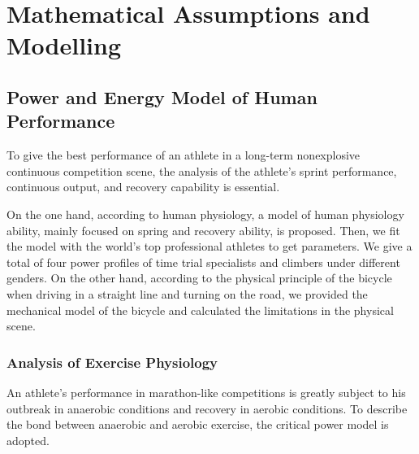 \documentclass{mcmthesis}
\begin{document}
\section{Mathematical Assumptions and Modelling}

\subsection{Power and Energy Model of Human Performance}
\par
To give the best performance of an athlete in a long-term nonexplosive continuous competition scene, the analysis of the athlete's  sprint performance, continuous output, and recovery capability is essential\cite{sreedhara_survey_2019}.
\par
On the one hand, according to human physiology, a model of human physiology ability, mainly focused on spring and recovery ability, is proposed. Then, we fit the model with the world's top professional athletes to get parameters. We give a total of four power profiles of time trial specialists and climbers under different genders. On the other hand, according to the physical principle of the bicycle when driving in a straight line and turning on the road, we provided the mechanical model of the bicycle and calculated the limitations in the physical scene.
\subsubsection{Analysis of Exercise Physiology}
\par
An athlete's performance in marathon-like competitions is greatly subject to his outbreak in anaerobic conditions and recovery in aerobic conditions. To describe the bond between anaerobic and aerobic exercise, the critical power model is adopted. 
\end{document}
